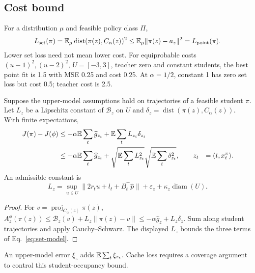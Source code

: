\subsection{Cost bound}
For a distribution $\mu$ and feasible policy class $\Pi$,
\begin{equation}
 L_{\rm set}(\pi)=\mathbb E_\mu\operatorname{dist}(\pi(z),C_\alpha(z))^2
 \leq\mathbb E_\mu\|\pi(z)-a_z\|^2=L_{\rm point}(\pi).
\end{equation}
Lower set loss need not mean lower cost. For equiprobable costs
$(u-1)^2,(u-2)^2$, $U=[-3,3]$, teacher zero and constant students,
the best point fit is 1.5 with MSE 0.25 and cost 0.25. At
$\alpha=1/2$, constant 1 has zero set loss but cost 0.5; teacher cost is 2.5.

\begin{proposition}\label{prop:set-cost}
Suppose the upper-model assumptions hold on trajectories of a feasible
student $\pi$. Let $L_z$ be a Lipschitz constant of $\mathcal B_z$ on $U$
and $\delta_z=\operatorname{dist}(\pi(z),C_\alpha(z))$. With finite expectations,
\begin{align}\label{eq:set-policy-bound}
 J(\pi)-J(\phi)&\leq-\alpha\mathbb E\sum_t\widehat g_{z_t}
                       +\mathbb E\sum_tL_{z_t}\delta_{z_t}\\
 &\leq-\alpha\mathbb E\sum_t\widehat g_{z_t}
 +\sqrt{\mathbb E\sum_tL_{z_t}^2}\sqrt{\mathbb E\sum_t\delta_{z_t}^2},\nonumber
 \qquad z_t&=(t,x_t^\pi).\nonumber
\end{align}
An admissible constant is
\begin{equation}
 L_z=\sup_{u\in U}\|2r_tu+l_t+B_t^\top\widehat p\|
       +\varepsilon_z+\kappa_z\operatorname{diam}(U).
\end{equation}
\end{proposition}
\begin{proof}
For $v=\operatorname{proj}_{C_\alpha(z)}\pi(z)$,
$A_z^\phi(\pi(z))\leq\mathcal B_z(v)+L_z\|\pi(z)-v\|
\leq-\alpha\widehat g_z+L_z\delta_z$.
Sum along student trajectories and apply Cauchy--Schwarz. The displayed
$L_z$ bounds the three terms of Eq.~\eqref{eq:set-model}.
\end{proof}
An upper-model error $\xi_z$ adds $\mathbb E\sum_t\xi_{z_t}$. Cache loss
requires a coverage argument to control this student-occupancy bound.

